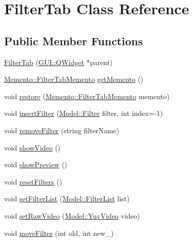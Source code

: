 \hypertarget{classGUI_1_1FilterTab}{}\section{Filter\+Tab Class Reference}
\label{classGUI_1_1FilterTab}
\subsection*{Public Member Functions}
\begin{DoxyCompactItemize}
\item 
\hyperlink{classGUI_1_1FilterTab_a3b29125d6d490f2cbdd22e453f79f6f9}{Filter\+Tab} (\hyperlink{classGUI_1_1QWidget}{G\+U\+I\+::\+Q\+Widget} $\ast$parent)
\item 
\hyperlink{classMemento_1_1FilterTabMemento}{Memento\+::\+Filter\+Tab\+Memento} \hyperlink{classGUI_1_1FilterTab_a7fc8423cb1fbba94b4f339ce1695312b}{get\+Memento} ()
\item 
void \hyperlink{classGUI_1_1FilterTab_a5ac565cc700848f69b7b30b83f9b7269}{restore} (\hyperlink{classMemento_1_1FilterTabMemento}{Memento\+::\+Filter\+Tab\+Memento} memento)
\item 
void \hyperlink{classGUI_1_1FilterTab_a3f8590a73c5ed6fd39daaa995e4fe04b}{insert\+Filter} (\hyperlink{classModel_1_1Filter}{Model\+::\+Filter} filter, int index=-\/1)
\item 
void \hyperlink{classGUI_1_1FilterTab_afbcb1308b246ae3f3008dd9854e1b276}{remove\+Filter} (string filter\+Name)
\item 
void \hyperlink{classGUI_1_1FilterTab_a8183c3773c11241bede44cedb223555f}{show\+Video} ()
\item 
void \hyperlink{classGUI_1_1FilterTab_a683e97e8ce40844fdccefc091a0e678e}{show\+Preview} ()
\item 
void \hyperlink{classGUI_1_1FilterTab_a4e238a9564770214fb84f0d542e846dc}{reset\+Filters} ()
\item 
void \hyperlink{classGUI_1_1FilterTab_a217572cdf98a98bd908c87600af7eb50}{set\+Filter\+List} (\hyperlink{classModel_1_1FilterList}{Model\+::\+Filter\+List} list)
\item 
void \hyperlink{classGUI_1_1FilterTab_ae01a11c0a081e873c992ebb245295903}{set\+Raw\+Video} (\hyperlink{classModel_1_1YuvVideo}{Model\+::\+Yuv\+Video} video)
\item 
void \hyperlink{classGUI_1_1FilterTab_a97ba0aa0c950aa895489093bbc6264f6}{move\+Filter} (int old, int new\+\_)
\end{DoxyCompactItemize}
